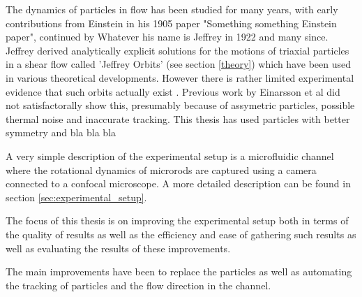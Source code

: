 The dynamics of particles in flow has been studied for many years, with early contributions from Einstein in his 1905 paper "Something something Einstein paper"\cite{EinsteinsPaper}, continued by Whatever his name is Jeffrey in 1922 and many since. Jeffrey derived analytically explicit solutions for the motions of triaxial particles in a shear flow called 'Jeffrey Orbits' (see section \ref{theory}) which have been used in various theoretical developments. However there is rather limited experimental evidence that such orbits actually exist \cite{IReallyWantACiteHere}. Previous work by Einarsson\cite{EinarssonsPaper} et al did not satisfactorally show this, presumably because of assymetric particles, possible thermal noise and inaccurate tracking. This thesis has used particles with better symmetry and bla bla bla


A very simple description of the experimental setup is a microfluidic channel where the rotational dynamics of microrods are captured using a camera connected to a confocal microscope. A more detailed description can be found in section \ref{sec:experimental_setup}. 

The focus of this thesis is on improving the experimental setup both in terms of the quality of results as well as the efficiency and ease of gathering such results as well as evaluating the results of these improvements.

The main improvements have been to replace the particles as well as automating the tracking of particles and the flow direction in the channel.